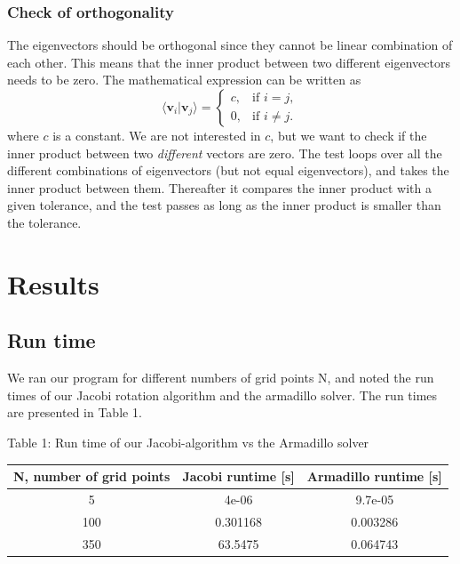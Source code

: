 \documentclass[norsk,a4paper,12pt]{article}
\begin{document}
\subsubsection{Check of orthogonality}
The eigenvectors should be orthogonal since they cannot be linear combination of each other. This means that the inner product between two different eigenvectors needs to be zero. The mathematical expression can be written as
\begin{equation}
\langle \textbf{v}_i|\textbf{v}_j\rangle =
    \begin{cases}
            c, &         \text{if } i=j,\\
            0, &         \text{if } i\neq j.
    \end{cases}
\end{equation}
where $c$ is a constant. We are not interested in $c$, but we want to check if the inner product between two \textit{different} vectors are zero. The test loops over all the different combinations of eigenvectors (but not equal eigenvectors), and takes the inner product between them. Thereafter it compares the inner product with a given tolerance, and the test passes as long as the inner product is smaller than the tolerance.

\section{Results}

\subsection{Run time}
\par
\vspace{3mm}
We ran our program for different numbers of grid points N, and noted the run times of our Jacobi rotation algorithm and the armadillo solver. The run times are presented in Table 1. 
\par
\vspace{3mm}


Table 1: Run time of our Jacobi-algorithm vs the Armadillo solver\par
\vspace{3mm}

\begin{tabular}{|c|c|c|}\hline
     {\bf N, number of grid points} & {\bf Jacobi runtime [s]} & {\bf Armadillo runtime [s]}\\ \hline
     5 & 4e-06 & 9.7e-05\\
     100 & 0.301168 & 0.003286 \\
     350 & 63.5475& 0.064743  \\ \hline
  
\end{tabular}\par
\end{document}
